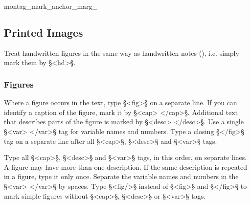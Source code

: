 \begin{sampleImage}{montag_mark_anchor_marg_} %
\end{sampleImage}



\label{section anchored comments}




\tocspace
\subsection{Printed Images}

\begin{note}
Treat handwritten figures in the same way as handwritten notes (), i.e. simply mark them by §<hd>§.
\end{note}


\subsubsection{Figures}
\label{section figures}

\begin{mainrule}
Where a figure occurs in the text, type §<fig>§ on a separate line. If you can identify a caption of the figure, mark it by §<cap> </cap>§. Additional text that describes parts of the figure is marked by §<desc> </desc>§. Use a single §<var> </var>§ tag for variable names and numbers. Type a closing §</fig>§ tag on a separate line after all §<cap>§, §<desc>§ and §<var>§ tags.
\end{mainrule}

\begin{clarification}
Type all §<cap>§, §<desc>§ and §<var>§ tags, in this order, on separate lines. 
A figure may have more than one description. 
If the same description is repeated in a figure, type it only once. 
Separate the variable names and numbers in the §<var> </var>§ by spaces.
Type §<fig/>§ instead of §<fig>§ and §</fig>§ to mark simple figures without §<cap>§, §<desc>§ or §<var>§ tags.
\end{clarification}

